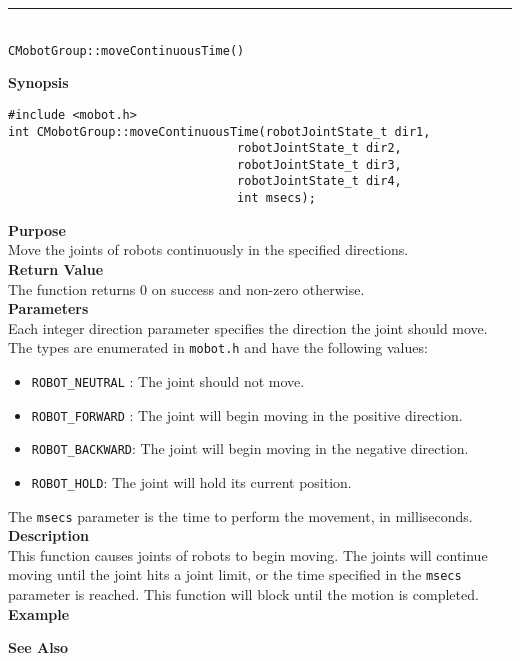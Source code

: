 \noindent
\vspace{5pt}
\rule{4.5in}{0.015in}\\
\noindent
{\LARGE \texttt{CMobotGroup::moveContinuousTime()}}\\
{}

\noindent
{\bf Synopsis}
\vspace{-8pt}
\begin{verbatim}
#include <mobot.h>
int CMobotGroup::moveContinuousTime(robotJointState_t dir1, 
                                robotJointState_t dir2, 
                                robotJointState_t dir3, 
                                robotJointState_t dir4, 
                                int msecs);
\end{verbatim}

\noindent
{\bf Purpose}\\
Move the joints of robots continuously in the specified directions.\\

\noindent
{\bf Return Value}\\
The function returns 0 on success and non-zero otherwise.\\

\noindent
{\bf Parameters}\\
Each integer direction parameter specifies the direction the joint should move. The types
are enumerated in \texttt{mobot.h} and have the following values:
\begin{itemize}
\item \texttt{ROBOT\_NEUTRAL} : The joint should not move.
\item \texttt{ROBOT\_FORWARD} : The joint will begin moving in the positive direction.
\item \texttt{ROBOT\_BACKWARD}: The joint will begin moving in the negative direction.
\item \texttt{ROBOT\_HOLD}: The joint will hold its current position.
\end{itemize}
The \texttt{msecs} parameter is the time to perform the movement, in milliseconds.
\\

\noindent
{\bf Description}\\
This function causes joints of robots to begin moving. The joints will continue moving
until the joint hits a joint limit, or the time specified in the \texttt{msecs} parameter
is reached. This function will block until the motion is completed.\\

\noindent
{\bf Example}\\
\noindent

\noindent
{\bf See Also}\\


